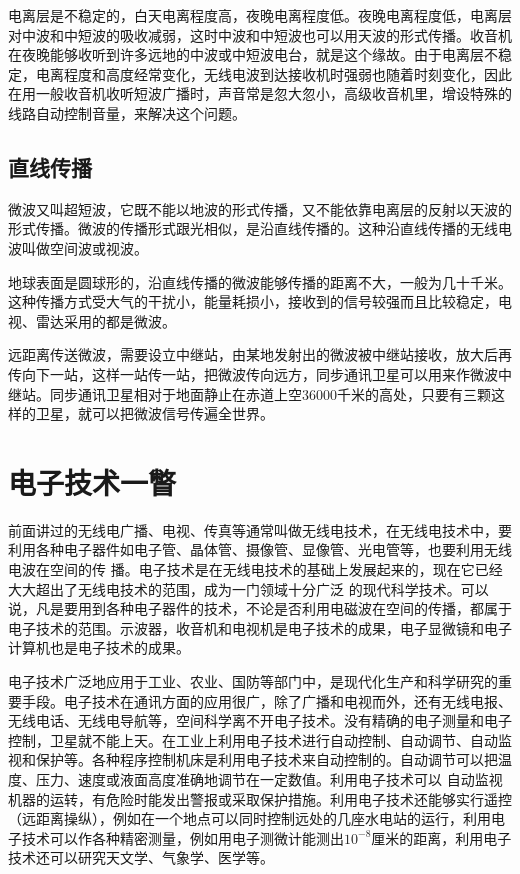 电离层是不稳定的，白天电离程度高，夜晚电离程度低。夜晚电离程度低，电离层对中波和中短波的吸收减弱，这时中波和中短波也可以用天波的形式传播。收音机在夜晚能够收听到许多远地的中波或中短波电台，就是这个缘故。由于电离层不稳定，电离程度和高度经常变化，无线电波到达接收机时强弱也随着时刻变化，因此在用一般收音机收听短波广播时，声音常是忽大忽小，高级收音机里，增设特殊的线路自动控制音量，来解决这个问题。

\subsection{直线传播}

微波又叫超短波，它既不能以地波的形式传播，又不能依靠电离层的反射以天波的形式传播。微波的传播形式跟光相似，是沿直线传播的。这种沿直线传播的无线电波叫做空间波或视波。

地球表面是圆球形的，沿直线传播的微波能够传播的距离不大，一般为几十千米。这种传播方式受大气的干扰小，能量耗损小，接收到的信号较强而且比较稳定，电视、雷达采用的都是微波。

远距离传送微波，需要设立中继站，由某地发射出的微波被中继站接收，放大后再传向下一站，这样一站传一站，把微波传向远方，同步通讯卫星可以用来作微波中继站。同步通讯卫星相对于地面静止在赤道上空36000千米的高处，只要有三颗这样的卫星，就可以把微波信号传遍全世界。

\section{电子技术一瞥}
前面讲过的无线电广播、电视、传真等通常叫做无线电技术，在无线电技术中，要利用各种电子器件如电子管、晶体管、摄像管、显像管、光电管等，也要利用无线电波在空间的传
播。电子技术是在无线电技术的基础上发展起来的，现在它已经大大超出了无线电技术的范围，成为一门领域十分广泛
的现代科学技术。可以说，凡是要用到各种电子器件的技术，不论是否利用电磁波在空间的传播，都属于电子技术的范围。示波器，收音机和电视机是电子技术的成果，电子显微镜和电子计算机也是电子技术的成果。

电子技术广泛地应用于工业、农业、国防等部门中，是现代化生产和科学研究的重要手段。电子技术在通讯方面的应用很广，除了广播和电视而外，还有无线电报、无线电话、无线电导航等，空间科学离不开电子技术。没有精确的电子测量和电子控制，卫星就不能上天。在工业上利用电子技术进行自动控制、自动调节、自动监视和保护等。各种程序控制机床是利用电子技术来自动控制的。自动调节可以把温度、压力、速度或液面高度准确地调节在一定数值。利用电子技术可以
自动监视机器的运转，有危险时能发出警报或采取保护措施。利用电子技术还能够实行遥控（远距离操纵），例如在一个地点可以同时控制远处的几座水电站的运行，利用电子技术可以作各种精密测量，例如用电子测微计能测出$10^{-8}$厘米的距离，利用电子技术还可以研究天文学、气象学、医学等。

